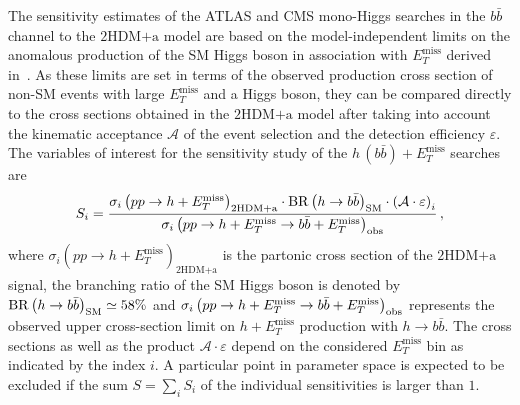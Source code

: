 \documentclass[a4paper, 11pt,notoc]{article}
\newcommand{\MET}{\ensuremath{E_T^\mathrm{miss}}\xspace}
\newcommand{\met}{\MET}
\newcommand{\hdma}{\ensuremath{\textrm{2HDM+a}}\xspace}
\begin{document}
The sensitivity estimates of the ATLAS and CMS mono-Higgs searches in the $b \bar b$ channel to the \hdma model are based on the model-independent limits on the anomalous production of the SM Higgs boson in association with \met derived in~\cite{Aaboud:2017yqz}.  As these limits are set in terms of the observed production cross section of non-SM events with large $\MET$ and a Higgs boson, they can be compared directly to the cross sections obtained in the \hdma model after taking into account the kinematic acceptance $\mathcal{A}$ of the event selection and the detection efficiency $\varepsilon$. The variables of interest for the sensitivity study of the $h \, (b \bar b) + \MET$ searches are
\begin{equation}
\label{eq:monoHbb_sensi}
S_i = \frac{\sigma_{i} \left ( p p \to h + \MET \right)_{\hdma} \cdot {\rm BR} \left (h \to b \bar b \right )_{\rm SM} \cdot \left ( \mathcal{A} \cdot \varepsilon \right)_i}
{\sigma_{i} \left ( p p \to h + \MET \to b \bar b + \MET \right)_{\rm obs}}\,,
\end{equation}
where $\sigma_{i} \left ( p p \to h + \MET \right)_{\hdma}$ is the partonic cross section of the \hdma signal,  the branching ratio of the SM Higgs boson is denoted by ${\rm BR} \left (h \to b \bar b \right )_{\rm SM} \simeq 58\%$  and $\sigma_{i} \left ( p p \to h + \MET \to b \bar b + \MET \right)_{\rm obs}$ represents the  observed upper cross-section limit on $h + \MET$ production with $h \to b \bar b$. The cross sections as well as the product $ \mathcal{A} \cdot \varepsilon$ depend on the considered $\MET$ bin as indicated by the index $i$.   A particular point in parameter space is expected to be excluded if the sum $S = \sum_i S_i$ of the individual sensitivities is larger than $1$.
\end{document}
